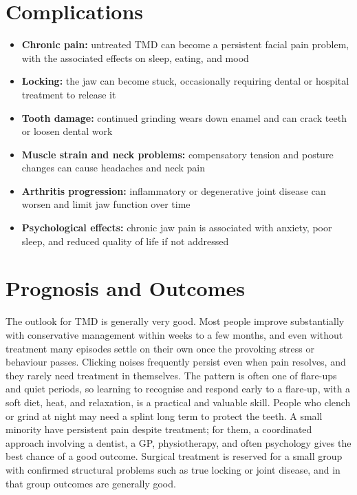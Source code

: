 \section*{Complications}
\begin{itemize}
    \item \textbf{Chronic pain:} untreated TMD can become a persistent facial pain problem, with the associated effects on sleep, eating, and mood
    \item \textbf{Locking:} the jaw can become stuck, occasionally requiring dental or hospital treatment to release it
    \item \textbf{Tooth damage:} continued grinding wears down enamel and can crack teeth or loosen dental work
    \item \textbf{Muscle strain and neck problems:} compensatory tension and posture changes can cause headaches and neck pain
    \item \textbf{Arthritis progression:} inflammatory or degenerative joint disease can worsen and limit jaw function over time
    \item \textbf{Psychological effects:} chronic jaw pain is associated with anxiety, poor sleep, and reduced quality of life if not addressed
\end{itemize}

\section*{Prognosis and Outcomes}
The outlook for TMD is generally very good. Most people improve substantially with conservative management within weeks to a few months, and even without treatment many episodes settle on their own once the provoking stress or behaviour passes. Clicking noises frequently persist even when pain resolves, and they rarely need treatment in themselves. The pattern is often one of flare-ups and quiet periods, so learning to recognise and respond early to a flare-up, with a soft diet, heat, and relaxation, is a practical and valuable skill. People who clench or grind at night may need a splint long term to protect the teeth. A small minority have persistent pain despite treatment; for them, a coordinated approach involving a dentist, a GP, physiotherapy, and often psychology gives the best chance of a good outcome. Surgical treatment is reserved for a small group with confirmed structural problems such as true locking or joint disease, and in that group outcomes are generally good.

